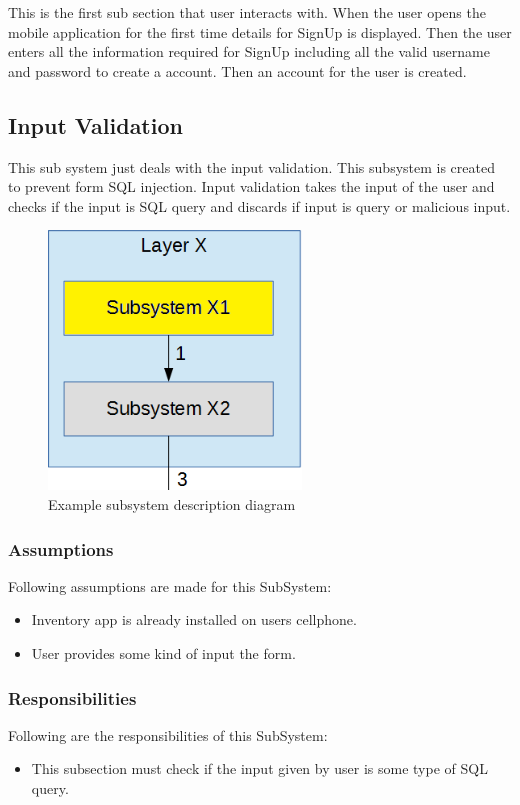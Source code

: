 This is the first sub section that user interacts with. When the user opens the mobile application for the first time details for SignUp is displayed. Then the user enters all the information required for SignUp including all the valid username and password to create a account. Then an account for the user is created.

\subsection{Input Validation}
This sub system just deals with the input validation. This subsystem is created to prevent form SQL injection. Input validation takes the input of the user and checks if the input is SQL query and discards if input is query or malicious input.

\begin{figure}[h!]
	\centering
 	\includegraphics[width=0.60\textwidth]{images/subsystem}
 \caption{Example subsystem description diagram}
\end{figure}

\subsubsection{Assumptions}
Following assumptions are made for this SubSystem:
\begin{itemize}
    \item Inventory app is already installed on users cellphone.
    \item User provides some kind of input the form.
\end{itemize}

\subsubsection{Responsibilities}
Following are the responsibilities of this SubSystem:
\begin{itemize}
    \item This subsection must check if the input given by user is some type of SQL query.
\end{itemize}

